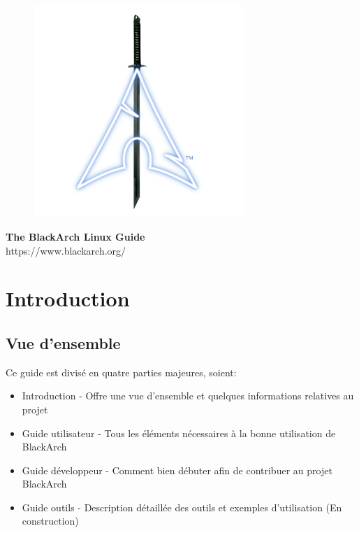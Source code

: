 \documentclass[a4paper, oneside, 11pt]{book}
\begin{document}
\pagestyle{empty}
\begin{center}
\begin{figure}[htbp]
\centering
\vspace{0.5cm}
\includegraphics[width=8cm]{images/logo.png}
\label{fig:logo}
\end{figure}
\vspace{0.5cm}
\Huge{\textbf{The BlackArch Linux Guide}}\\
\vspace{1cm}
\Large{\color{blue}https://www.blackarch.org/}\\
\vspace{0.5cm}
\end{center}
\newpage
\tableofcontents
\newpage
\pagestyle{fancy}


\chapter{Introduction}

\section{Vue d'ensemble}

Ce guide est divis\'{e} en quatre parties majeures, soient:
\begin{itemize}
\item Introduction - Offre une vue d'ensemble et quelques informations relatives au projet
\item Guide utilisateur - Tous les \'{e}l\'{e}ments n\'{e}cessaires \`{a} la bonne utilisation de BlackArch
\item Guide d\'{e}veloppeur - Comment bien d\'{e}buter afin de contribuer au projet BlackArch
\item Guide outils - Description d\'{e}taill\'{e}e des outils et exemples d'utilisation (En construction)
\end{itemize}
\end{document}
